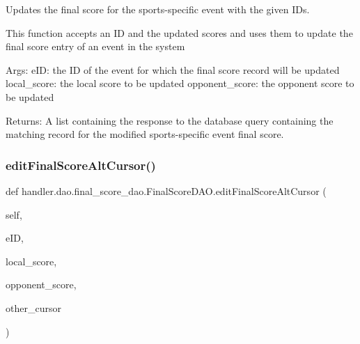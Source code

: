 \begin{DoxyVerb}Updates the final score for the sports-specific event with the given IDs.

This function accepts an ID and the updated scores and uses them to update
the final score entry of an event in the system

Args:
    eID: the ID of the event for which the final score record will be updated
    local_score: the local score to be updated
    opponent_score: the opponent score to be updated
   
    
Returns:
    A list containing the response to the database query
    containing the matching record for the modified sports-specific
    event final score.
\end{DoxyVerb}
 \mbox{\label{classhandler_1_1dao_1_1final__score__dao_1_1_final_score_d_a_o_aafed0bf1088db869afca195a3a7e4fb2}} 
\subsubsection{\texorpdfstring{edit\+Final\+Score\+Alt\+Cursor()}{editFinalScoreAltCursor()}}
{\footnotesize\ttfamily def handler.\+dao.\+final\+\_\+score\+\_\+dao.\+Final\+Score\+D\+A\+O.\+edit\+Final\+Score\+Alt\+Cursor (\begin{DoxyParamCaption}\item[{}]{self,  }\item[{}]{e\+ID,  }\item[{}]{local\+\_\+score,  }\item[{}]{opponent\+\_\+score,  }\item[{}]{other\+\_\+cursor }\end{DoxyParamCaption})}

